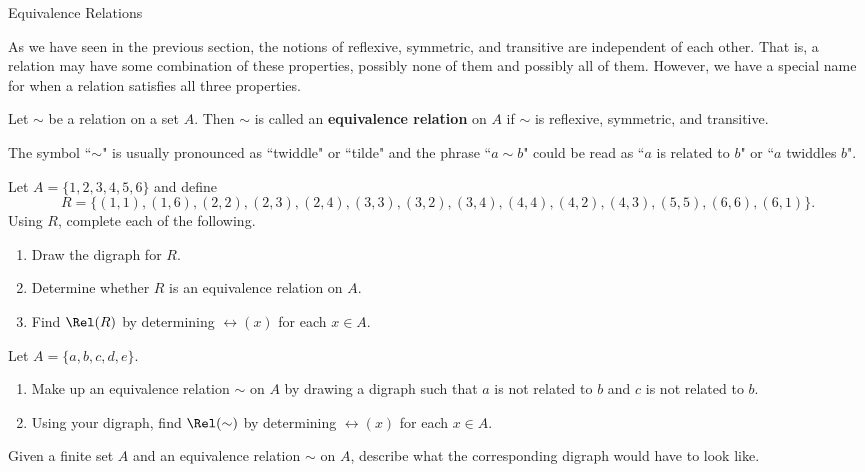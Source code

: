 \begin{section}{Equivalence Relations}

As we have seen in the previous section, the notions of reflexive, symmetric, and transitive are independent of each other. That is, a relation may have some combination of these properties, possibly none of them and possibly all of them.  However, we have a special name for when a relation satisfies all three properties.

\begin{definition}
Let $\sim$ be a relation on a set $A$.  Then $\sim$ is called an \textbf{equivalence relation} on $A$ if $\sim$ is reflexive, symmetric, and transitive.
\end{definition}

The symbol ``$\sim$" is usually pronounced as ``twiddle" or ``tilde" and the phrase ``$a\sim b$" could be read as ``$a$ is related to $b$" or ``$a$ twiddles $b$".

\begin{problem}\label{prob:digraph}
Let $A=\{1,2,3,4,5,6\}$ and define
\[
R=\{(1,1),(1,6),(2,2),(2,3),(2,4),(3,3),(3,2),(3,4),(4,4),(4,2),(4,3),(5,5),(6,6),(6,1)\}.
\]
Using $R$, complete each of the following.
\begin{enumerate}[label=\textrm{(\alph*)}]
\item Draw the digraph for $R$.
\item Determine whether $R$ is an equivalence relation on $A$.
\item Find $\Rel(R)$ by determining $\rel(x)$ for each $x\in A$.
\end{enumerate}
\end{problem}

\begin{problem}\label{prob:made up}
Let $A=\{a,b,c,d,e\}$.  
\begin{enumerate}[label=\textrm{(\alph*)}]
\item Make up an equivalence relation $\sim$ on $A$ by drawing a digraph such that $a$ is not related to $b$ and $c$ is not related to $b$.  
\item Using your digraph, find $\Rel(\sim)$ by determining $\rel(x)$ for each $x\in A$.
\end{enumerate}
\end{problem}

\begin{problem}
Given a finite set $A$ and an equivalence relation $\sim$ on $A$, describe what the corresponding digraph would have to look like.
\end{problem}


\end{section}
